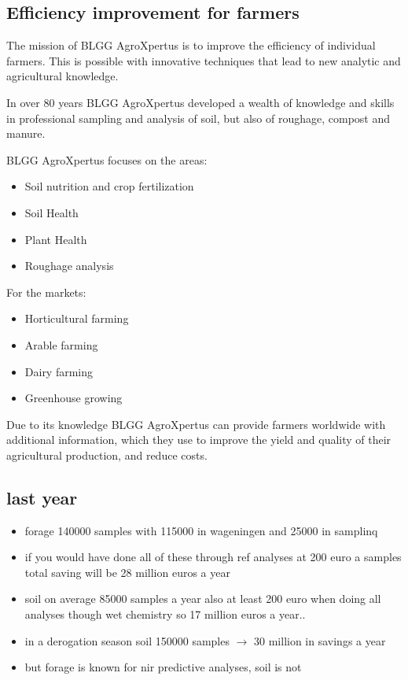 \documentclass{llncs}
\begin{document}
\subsection{Efficiency improvement for farmers}

The mission of BLGG AgroXpertus is to improve the efficiency of individual farmers. This is possible with innovative techniques that lead to new analytic and agricultural knowledge. 

In over 80 years BLGG AgroXpertus developed a wealth of knowledge and skills in professional sampling and analysis of soil, but also of roughage, compost and manure. 

BLGG AgroXpertus focuses on the areas: 
\begin{itemize}
  \item Soil nutrition and crop fertilization 
  \item Soil Health 
  \item Plant Health 
  \item Roughage analysis 
\end{itemize}

For the markets: 
\begin{itemize}
  \item Horticultural farming 
  \item Arable farming 
  \item Dairy farming 
  \item Greenhouse growing 
\end{itemize}

Due to its knowledge BLGG AgroXpertus can provide farmers worldwide with additional information, which they use to improve the yield and quality of their agricultural production, and reduce costs. 


\subsection{last year}

\begin{itemize}
  \item forage 140000 samples with 115000 in wageningen and 25000 in samplinq 
  \item if you would have done all of these through ref analyses at 200 euro a samples total saving will be 28 million euros a year 
  \item soil  on average 85000 samples a year also at least 200 euro when doing all analyses though wet chemistry so 17 million euros a year.. 
  \item in a derogation season soil 150000 samples $\rightarrow$ 30 million in savings a year 
  \item but forage is known for nir  predictive analyses, soil is not 
\end{itemize}
\end{document}
